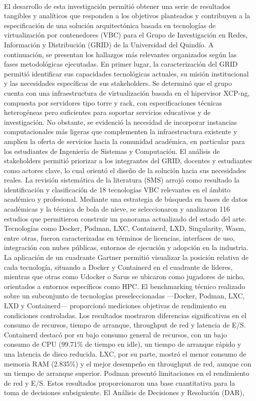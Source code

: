 \label{cap:resultados}
\mbox{}\\
El desarrollo de esta investigación permitió obtener una serie de resultados tangibles y analíticos que responden a los objetivos planteados y contribuyen a la especificación de una solución arquitectónica basada en tecnologías de virtualización por contenedores (VBC) para el Grupo de Investigación en Redes, Información y Distribución (GRID) de la Universidad del Quindío. A continuación, se presentan los hallazgos más relevantes organizados según las fases metodológicas ejecutadas. En primer lugar, la caracterización del GRID permitió identificar sus capacidades tecnológicas actuales, su misión institucional y las necesidades específicas de sus stakeholders. Se determinó que el grupo cuenta con una infraestructura de virtualización basada en el hipervisor XCP-ng, compuesta por servidores tipo torre y rack, con especificaciones técnicas heterogéneas pero suficientes para soportar servicios educativos y de investigación. No obstante, se evidenció la necesidad de incorporar instancias computacionales más ligeras que complementen la infraestructura existente y amplíen la oferta de servicios hacia la comunidad académica, en particular para los estudiantes de Ingeniería de Sistemas y Computación. El análisis de stakeholders permitió priorizar a los integrantes del GRID, docentes y estudiantes como actores clave, lo cual orientó el diseño de la solución hacia sus necesidades reales. La revisión sistemática de la literatura (SMS) arrojó como resultado la identificación y clasificación de 18 tecnologías VBC relevantes en el ámbito académico y profesional. Mediante una estrategia de búsqueda en bases de datos académicas y la técnica de bola de nieve, se seleccionaron y analizaron 116 estudios que permitieron construir un panorama actualizado del estado del arte. Tecnologías como Docker, Podman, LXC, Containerd, LXD, Singularity, Wasm, entre otras, fueron caracterizadas en términos de licencias, interfaces de uso, integración con nubes públicas, entornos de ejecución y adopción en la industria. La aplicación de un cuadrante Gartner permitió visualizar la posición relativa de cada tecnología, situando a Docker y Containerd en el cuadrante de líderes, mientras que otras como Udocker o Sarus se ubicaron como jugadores de nicho, orientados a entornos específicos como HPC. El benchmarking técnico realizado sobre un subconjunto de tecnologías preseleccionadas —Docker, Podman, LXC, LXD y Containerd— proporcionó mediciones objetivas de rendimiento en condiciones controladas. Los resultados mostraron diferencias significativas en el consumo de recursos, tiempo de arranque, throughput de red y latencia de E/S. Containerd destacó por su bajo consumo general de recursos, con un bajo consumo de CPU (99.71\% de tiempo en idle), un tiempo de arranque rápido y una latencia de disco reducida. LXC, por su parte, mostró el menor consumo de memoria RAM (2.835\%) y el mejor desempeño en throughput de red, aunque con un tiempo de arranque superior. Podman presentó limitaciones en el rendimiento de red y E/S. Estos resultados proporcionaron una base cuantitativa para la toma de decisiones subsiguiente. El Análisis de Decisiones y Resolución (DAR), 